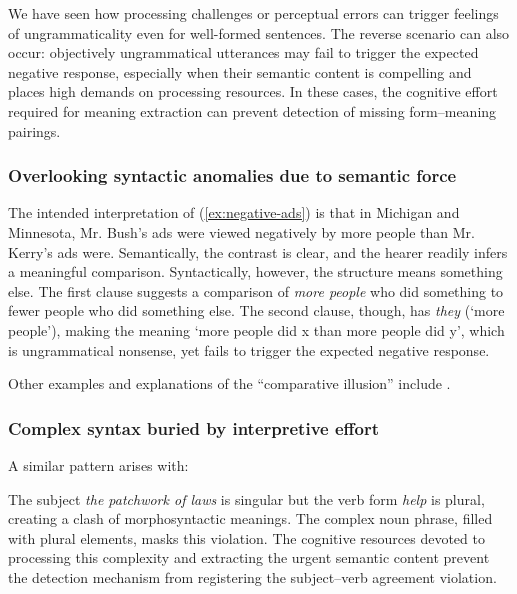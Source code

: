 \documentclass[12pt,letterpaper]{article}
\begin{document}
We have seen how processing challenges or perceptual errors can trigger feelings of ungrammaticality even for well-formed sentences. The reverse scenario can also occur: objectively ungrammatical utterances may fail to trigger the expected negative response, especially when their semantic content is compelling and places high demands on processing resources. In these cases, the cognitive effort required for meaning extraction can prevent detection of missing form--meaning pairings.

\subsubsection{Overlooking syntactic anomalies due to semantic force}


\label{ex:negative-ads}
\z
The intended interpretation of (\ref{ex:negative-ads}) is that in Michigan and Minnesota, Mr. Bush's ads were viewed negatively by more people than Mr. Kerry's ads were. Semantically, the contrast is clear, and the hearer readily infers a meaningful comparison. Syntactically, however, the structure means something else. The first clause suggests a comparison of \textit{more people} who did something to fewer people who did something else. The second clause, though, has \textit{they} (`more people'), making the meaning `more people did x than more people did y', which is ungrammatical nonsense, yet fails to trigger the expected negative response.

Other examples and explanations of the ``comparative illusion'' include \textcite{OConnor2015, Wellwood2018, Leivada2020, zhang2023}.

\subsubsection{Complex syntax buried by interpretive effort}
A similar pattern arises with:
\z

The subject \textit{the patchwork of laws} is singular but the verb form \textit{help} is plural, creating a clash of morphosyntactic meanings. The complex noun phrase, filled with plural elements, masks this violation. The cognitive resources devoted to processing this complexity and extracting the urgent semantic content prevent the detection mechanism from registering the subject--verb agreement violation. 
\end{document}
